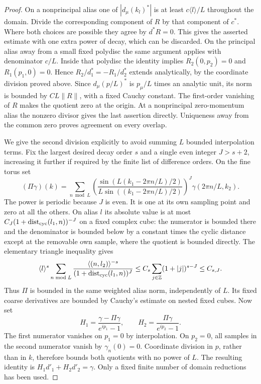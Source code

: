 \begin{proof}
On a nonprincipal alias one of $|d_\mu(k_l)^*|$ is at least
$c\langle l\rangle/L$ throughout the domain.  Divide the
corresponding component of $R$ by that component of $c^*$.
Where both choices are possible they agree by $d^*R=0$.
This gives the asserted estimate with one extra power of decay,
which can be discarded.  On the principal alias away from a small
fixed polydisc the same argument applies with denominator $c/L$.
Inside that polydisc the identity implies
$R_2(0,p_2)=0$ and $R_1(p_1,0)=0$.
Hence $R_2/d_1^*=-R_1/d_2^*$ extends analytically, by the coordinate
division proved above.  Since $d_\mu(p/L)^*$ is $p_\mu/L$ times
an analytic unit, its norm is bounded by $CL\|R\|$, with a fixed
Cauchy constant.  The first-order vanishing of $R$ makes the
quotient zero at the origin.  At a nonprincipal zero-momentum alias
the nonzero divisor gives the last assertion directly.  Uniqueness
away from the common zero proves agreement on every overlap.

We give the second division explicitly to avoid summing $L$ bounded
interpolation terms.  Fix the largest desired decay order $s$ and a
single even integer $J>s+2$, increasing it further if required by
the finite list of difference orders.  On the fine torus set
\[
 (\Pi\gamma)(k)=\sum_{n\bmod L}
 \left(\frac{\sin(L(k_1-2\pi n/L)/2)}
 {L\sin((k_1-2\pi n/L)/2)}\right)^J
                 \gamma(2\pi n/L,k_2).
\]
The power is periodic because $J$ is even.  It is one at its own
sampling point and zero at all the others.  On alias $l$ its
absolute value is at most
$C_J(1+\operatorname{dist}_{\rm cyc}(l_1,n))^{-J}$
on a fixed complex cube: the numerator is bounded there and the
denominator is bounded below by a constant times the cyclic
distance except at the removable own sample, where the quotient
is bounded directly.  The elementary triangle inequality gives
\begin{equation}
 \langle l\rangle^s
 \sum_{n\bmod L}
 \frac{\langle(n,l_2)\rangle^{-s}}
 {(1+\operatorname{dist}_{\rm cyc}(l_1,n))^J}
 \le C_s\sum_{j\in\mathbb Z}(1+|j|)^{s-J}\le C_{s,J}.
                                                               \label{app:analytic-5}
\end{equation}
Thus $\Pi$ is bounded in the same weighted alias norm, independently
of $L$.  Its fixed coarse derivatives are bounded by Cauchy's
estimate on nested fixed cubes.  Now set
\[
 H_1=\frac{\gamma-\Pi\gamma}{e^{ip_1}-1},\qquad
 H_2=\frac{\Pi\gamma}{e^{ip_2}-1}.
\]
The first numerator vanishes on $p_1=0$ by interpolation.  On
$p_2=0$, all samples in the second numerator vanish by
$\gamma_n(0)=0$.  Coordinate division in $p$, rather than in $k$,
therefore bounds both quotients with no power of $L$.
The resulting identity is $H_1d'_1+H_2d'_2=\gamma$.
Only a fixed finite number of domain reductions has been used.
\end{proof}

